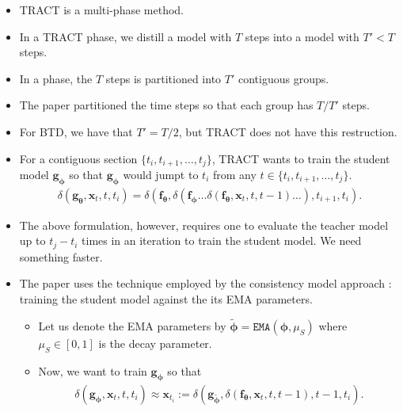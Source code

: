 \documentclass[10pt]{article}
\newcommand{\ve}[1]{\mathbf{#1}}
\newcommand{\ves}[1]{\boldsymbol{#1}}
\begin{document}
\begin{itemize}
  \item TRACT is a multi-phase method.
  
  \item In a TRACT phase, we distill a model with $T$ steps into a model with $T' < T$ steps.
  
  \item In a phase, the $T$ steps is partitioned into $T'$ contiguous groups.
  
  \item The paper partitioned the time steps so that each group has $T/T'$ steps.
  
  \item For BTD, we have that $T' = T/2$, but TRACT does not have this restruction.
  
  \item For a contiguous section $\{t_i, t_{i+1}, \dotsc, t_j \}$, TRACT wants to train the student model $\ve{g}_{\ves{\phi}}$ so that $\ve{g}_{\ves{\phi}}$ would jumpt to $t_i$ from any $t \in \{ t_i, t_{i+1}, \dotsc, t_j \}$.
  \begin{align*}
    \delta(\ve{g}_{\ves{\theta}}, \ve{x}_t, t, t_i)
    = \delta(\ve{f}_{\ves{\theta}}, \delta( \ve{f}_{\ves{\phi}} \dotsc \delta(\ve{f}_{\ves{\theta}}, \ve{x}_t, t, t-1 ) \dotsc), t_{i+1}, t_i).
  \end{align*}

  \item The above formulation, however, requires one to evaluate the teacher model up to $t_j - t_i$ times in an iteration to train the student model. We need something faster.
  
  \item The paper uses the technique employed by the consistency model approach \cite{Song:2023}: training the student model against the its EMA parameters.
  \begin{itemize}
    \item Let us denote the EMA parameters by $\tilde{\ves{\phi}} = \texttt{EMA}(\ves{\phi}, \mu_S)$ where $\mu_S \in [0,1]$ is the decay parameter.
    
    \item Now, we want to train $\ve{g}_{\ves{\phi}}$ so that
    \begin{align*}
      \delta(\ve{g}_{\ves{\phi}}, \ve{x}_t, t, t_i)
      \approx \ve{x}_{t_i} := \delta(\ve{g}_{\tilde{\ves{\phi}}}, \delta(\ve{f}_{\ves{\theta}}, \ve{x}_t, t, t-1), t-1, t_i).
    \end{align*}
    

\end{itemize}
\end{itemize}
\end{document}
